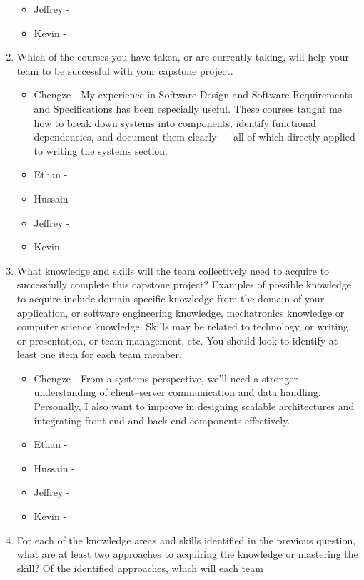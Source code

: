 \begin{enumerate}
\begin{itemize}
        \item Jeffrey - 
        \item Kevin - 
  \end{itemize} 
  \item Which of the courses you have taken, or are currently taking, will help
  your team to be successful with your capstone project.
  \begin{itemize}
        \item Chengze - My experience in Software Design and Software Requirements 
        and Specifications has been especially useful. These courses taught me how 
        to break down systems into components, identify functional dependencies, and 
        document them clearly — all of which directly applied to writing the systems section.
        \item Ethan - 
        \item Hussain - 
        \item Jeffrey - 
        \item Kevin - 
  \end{itemize} 
  \item What knowledge and skills will the team collectively need to acquire to
  successfully complete this capstone project?  Examples of possible knowledge
  to acquire include domain specific knowledge from the domain of your
  application, or software engineering knowledge, mechatronics knowledge or
  computer science knowledge.  Skills may be related to technology, or writing,
  or presentation, or team management, etc.  You should look to identify at
  least one item for each team member.
  \begin{itemize}
        \item Chengze - From a systems perspective, we’ll need a stronger understanding 
        of client–server communication and data handling. Personally, I also want to 
        improve in designing scalable architectures and integrating front-end and back-end 
        components effectively.
        \item Ethan - 
        \item Hussain - 
        \item Jeffrey - 
        \item Kevin - 
  \end{itemize} 
  \item For each of the knowledge areas and skills identified in the previous
  question, what are at least two approaches to acquiring the knowledge or
  mastering the skill?  Of the identified approaches, which will each team

\end{enumerate}

